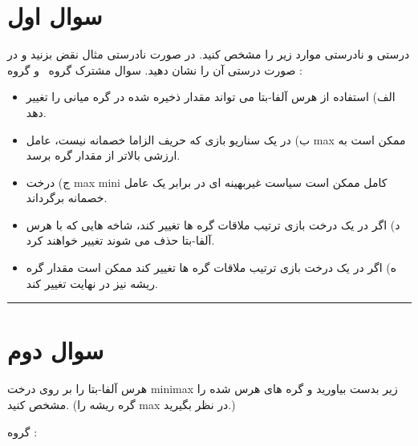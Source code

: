 \documentclass[a4paper,10pt]{article}
\newcommand{\GroupA}{\noindent \textcolor{AccentGold}{گروه \lr{a}}}
\newcommand{\GroupB}{\noindent\textcolor{AccentCyan}{گروه \lr{b}}}
\begin{document}
\section{\textcolor{AccentGold}{سوال اول}}
درستی و نادرستی موارد زیر را مشخص کنید. در صورت نادرستی مثال نقض بزنید و در صورت درستی آن را نشان دهید.
\vspace{0.2cm}
	سوال مشترک \GroupA \, و \GroupB: 
\begin{itemize}
	\item 
	الف) استفاده از هرس آلفا-بتا می تواند مقدار ذخیره شده در گره میانی را تغییر دهد.
	\item 
	ب) در یک سناریو بازی که حریف الزاما خصمانه نیست، عامل max ممکن است به ارزشی بالاتر از مقدار گره برسد.
	\item 
	ج) درخت max mini کامل ممکن است سیاست غیربهینه ای در برابر یک عامل خصمانه برگرداند.
	\item 
	د) اگر در یک درخت بازی ترتیب ملاقات گره ها تغییر کند، شاخه هایی که با هرس آلفا-بتا حذف می شوند تغییر خواهند کرد.
	\item 
	ه) اگر در یک درخت بازی ترتیب ملاقات گره ها تغییر کند ممکن است مقدار گره ریشه نیز در نهایت تغییر کند.
\end{itemize}
\textcolor{AccentCyan}{\rule{\linewidth}{0.4pt}}
\pagebreak
\section{\textcolor{AccentGold}{سوال دوم}}

هرس آلفا-بتا را بر روی درخت minimax زیر بدست بیاورید و گره های هرس شده را مشخص کنید. (گره ریشه را max در نظر بگیرید.)

\GroupA:
\end{document}

